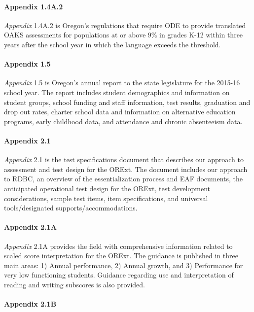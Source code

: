 \documentclass[]{article}
\let\oldparagraph\paragraph
\renewcommand{\paragraph}[1]{\oldparagraph{#1}\mbox{}}
\begin{document}
\paragraph{Appendix 1.4A.2}\label{appendix-1.4a.2}

\emph{Appendix} 1.4A.2 is Oregon's regulations that require ODE to
provide translated OAKS assessments for populations at or above 9\% in
grades K-12 within three years after the school year in which the
language exceeds the threshold.

\paragraph{Appendix 1.5}\label{appendix-1.5}

\emph{Appendix} 1.5 is Oregon's annual report to the state legislature
for the 2015-16 school year. The report includes student demographics
and information on student groups, school funding and staff information,
test results, graduation and drop out rates, charter school data and
information on alternative education programs, early childhood data, and
attendance and chronic absenteeism data.

\paragraph{Appendix 2.1}\label{appendix-2.1}

\emph{Appendix} 2.1 is the test specifications document that describes
our approach to assessment and test design for the ORExt. The document
includes our approach to RDBC, an overview of the essentialization
process and EAF documents, the anticipated operational test design for
the ORExt, test development considerations, sample test items, item
specifications, and universal tools/designated supports/accommodations.

\paragraph{Appendix 2.1A}\label{appendix-2.1a}

\emph{Appendix} 2.1A provides the field with comprehensive information
related to scaled score interpretation for the ORExt. The guidance is
published in three main areas: 1) Annual performance, 2) Annual growth,
and 3) Performance for very low functioning students. Guidance regarding
use and interpretation of reading and writing subscores is also
provided.

\paragraph{Appendix 2.1B}\label{appendix-2.1b}
\end{document}
